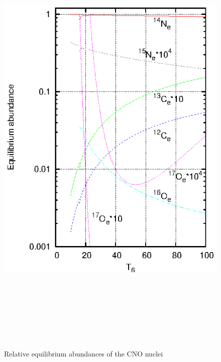 \documentclass[12pt,a4paper,titlepage]{jarticle}
\begin{document}
\title{}
\author{A4SB2121　遊佐秀作}
\date{}

\begin{figure}[H]
\begin{center}
\includegraphics[width=170mm,height=220mm]{CNO_Equi_Abund.eps}
\caption{Relative equilibrium abundances of the CNO nuclei}
\end{center}
\end{figure}
\end{document}
